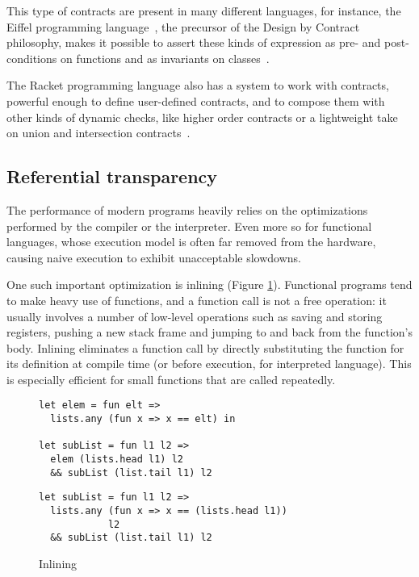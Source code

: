 \documentclass[sigplan,screen,10pt]{acmart}
\begin{document}
This type of contracts are present in many different languages,
for instance, the Eiffel programming language~\cite{meyer1987eiffel}, the precursor
of the Design by Contract philosophy, makes it possible to assert
these kinds of expression as pre- and post-conditions on
functions and as invariants on classes~\cite{EiffelDesignByContract}.

The Racket programming language also has a system to work with
contracts, powerful enough to define user-defined contracts, and
to compose them with other kinds of dynamic checks,
like higher order contracts or a lightweight take on union
and intersection contracts~\cite{RacketContracts}.


\subsection{Referential transparency}
\label{sec:optimizations}

The performance of modern programs heavily relies on the optimizations performed
by the compiler or the interpreter. Even more so for functional languages, whose
execution model is often far removed from the hardware, causing naive execution
to exhibit unacceptable slowdowns.

One such important optimization is inlining (Figure
\ref{fig:optimizations-inlining-ex}). Functional programs tend to make heavy use
of functions, and a function call is not a free operation: it usually involves a
number of low-level operations such as saving and storing registers, pushing a new stack
frame and jumping to and back from the function's body. Inlining eliminates a
function call by directly substituting the function for its definition at
compile time (or before execution, for interpreted language). This is especially
efficient for small functions that are called repeatedly.

\begin{figure}[h]
  \begin{center}
\begin{lstlisting}[language=nickel,title={Source program}]
let elem = fun elt =>
  lists.any (fun x => x == elt) in

let subList = fun l1 l2 =>
  elem (lists.head l1) l2
  && subList (list.tail l1) l2
\end{lstlisting}
\begin{lstlisting}[language=nickel,title={Optimized program}]
let subList = fun l1 l2 =>
  lists.any (fun x => x == (lists.head l1))
            l2
  && subList (list.tail l1) l2
\end{lstlisting}
  \end{center}
\caption{Inlining}
\label{fig:optimizations-inlining-ex}
\end{figure}
\end{document}
